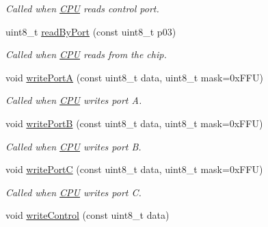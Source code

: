 \begin{DoxyCompactItemize}
\begin{DoxyCompactList}\small\item\em Called when \hyperlink{classCPU}{C\-P\-U} reads control port. \end{DoxyCompactList}\item 
\hypertarget{classIntel8255_a2b1c343c6cfa15e20122571ce3a42c6e}{uint8\-\_\-t \hyperlink{classIntel8255_a2b1c343c6cfa15e20122571ce3a42c6e}{read\-By\-Port} (const uint8\-\_\-t p03)}\label{classIntel8255_a2b1c343c6cfa15e20122571ce3a42c6e}

\begin{DoxyCompactList}\small\item\em Called when \hyperlink{classCPU}{C\-P\-U} reads from the chip. \end{DoxyCompactList}\item 
\hypertarget{classIntel8255_a2b959c90c912c12e8d881cd21b59671e}{void \hyperlink{classIntel8255_a2b959c90c912c12e8d881cd21b59671e}{write\-Port\-A} (const uint8\-\_\-t data, uint8\-\_\-t mask=0x\-F\-F\-U)}\label{classIntel8255_a2b959c90c912c12e8d881cd21b59671e}

\begin{DoxyCompactList}\small\item\em Called when \hyperlink{classCPU}{C\-P\-U} writes port A. \end{DoxyCompactList}\item 
\hypertarget{classIntel8255_a54bf45490f90f882c7ddba55bb9dcff3}{void \hyperlink{classIntel8255_a54bf45490f90f882c7ddba55bb9dcff3}{write\-Port\-B} (const uint8\-\_\-t data, uint8\-\_\-t mask=0x\-F\-F\-U)}\label{classIntel8255_a54bf45490f90f882c7ddba55bb9dcff3}

\begin{DoxyCompactList}\small\item\em Called when \hyperlink{classCPU}{C\-P\-U} writes port B. \end{DoxyCompactList}\item 
\hypertarget{classIntel8255_ad08321013139ad0a6f168165ae8c68a7}{void \hyperlink{classIntel8255_ad08321013139ad0a6f168165ae8c68a7}{write\-Port\-C} (const uint8\-\_\-t data, uint8\-\_\-t mask=0x\-F\-F\-U)}\label{classIntel8255_ad08321013139ad0a6f168165ae8c68a7}

\begin{DoxyCompactList}\small\item\em Called when \hyperlink{classCPU}{C\-P\-U} writes port C. \end{DoxyCompactList}\item 
\hypertarget{classIntel8255_a7f5bc4528c2d868b1530c45ee6172982}{void \hyperlink{classIntel8255_a7f5bc4528c2d868b1530c45ee6172982}{write\-Control} (const uint8\-\_\-t data)}\label{classIntel8255_a7f5bc4528c2d868b1530c45ee6172982}


\end{DoxyCompactItemize}

